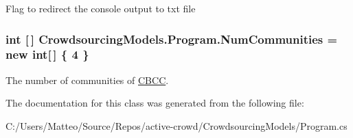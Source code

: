 Flag to redirect the console output to txt file 

\hypertarget{class_crowdsourcing_models_1_1_program_aaf063cf9af3dc47e84aaab11562a5b12}{}
\subsubsection[{Num\+Communities}]{\setlength{\rightskip}{0pt plus 5cm}int \mbox{[}$\,$\mbox{]} Crowdsourcing\+Models.\+Program.\+Num\+Communities = new int\mbox{[}$\,$\mbox{]} \{ 4 \}\hspace{0.3cm}{\ttfamily [static]}}\label{class_crowdsourcing_models_1_1_program_aaf063cf9af3dc47e84aaab11562a5b12}


The number of communities of \hyperlink{class_crowdsourcing_models_1_1_c_b_c_c}{C\+B\+C\+C}. 



The documentation for this class was generated from the following file\+:\begin{DoxyCompactItemize}
\item 
C\+:/\+Users/\+Matteo/\+Source/\+Repos/active-\/crowd/\+Crowdsourcing\+Models/Program.\+cs\end{DoxyCompactItemize}

